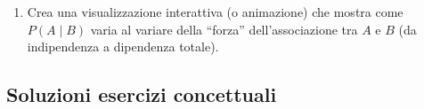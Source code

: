 \documentclass[
  letterpaper,
  DIV=11,
  numbers=noendperiod,
  oneside]{scrreprt}
\providecommand{\tightlist}{%
  \setlength{\itemsep}{0pt}\setlength{\parskip}{0pt}}
\theoremstyle{definition}
\theoremstyle{plain}
\theoremstyle{definition}
\theoremstyle{remark}
\begin{document}
\begin{tcolorbox}
\begin{enumerate}
  \begin{itemize}
  \tightlist
  \item
    Genera dati per due gruppi con trend positivo in ciascuno
  \item
    Aggrega i dati mostrando inversione del trend
  \item
    Visualizza con ggplot
  \end{itemize}
\item
  Crea una visualizzazione interattiva (o animazione) che mostra come
  \(P(A \mid B)\) varia al variare della ``forza'' dell'associazione tra
  \(A\) e \(B\) (da indipendenza a dipendenza totale).
\end{enumerate}

\end{tcolorbox}

\begin{tcolorbox}[enhanced jigsaw, arc=.35mm, breakable, colbacktitle=quarto-callout-tip-color!10!white, opacityback=0, toprule=.15mm, rightrule=.15mm, colback=white, opacitybacktitle=0.6, leftrule=.75mm, coltitle=black, bottomtitle=1mm, left=2mm, toptitle=1mm, title=\textcolor{quarto-callout-tip-color}{\faLightbulb}\hspace{0.5em}{Soluzioni selezionate}, titlerule=0mm, bottomrule=.15mm, colframe=quarto-callout-tip-color-frame]

\subsection{Soluzioni esercizi
concettuali}\label{soluzioni-esercizi-concettuali}


\end{tcolorbox}
\end{document}
